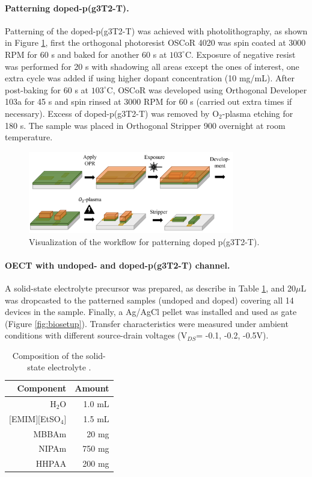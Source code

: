 \paragraph{Patterning doped-p(g3T2-T).}Patterning of the doped-p(g3T2-T) was achieved with photolithography, as shown in Figure \ref{fig:dopedpat}, first the orthogonal photoresist OSCoR 4020 was spin coated at 3000 RPM for 60 s and baked for another 60 s at $103^{\circ}$C. Exposure of negative resist was performed for 20 s with shadowing all areas except the ones of interest, one extra cycle was added if using higher dopant concentration (10 mg/mL). After post-baking for 60 s at $103^{\circ}$C, OSCoR was developed using Orthogonal Developer 103a for 45 s and spin rinsed at 3000 RPM for 60 s (carried out extra times if necessary). Excess of doped-p(g3T2-T) was removed by O$_{2}$-plasma etching for 180 s. The sample was placed in Orthogonal Stripper 900 overnight at room temperature.

\begin{figure}[ht]
	\centering
	\includegraphics[width=9cm]{Images/pdf/doped-patterning.pdf}
	\caption{Visualization of the workflow for patterning doped p(g3T2-T).}
	\label{fig:dopedpat}
\end{figure}

\paragraph{OECT with undoped- and doped-p(g3T2-T) channel.} A solid-state electrolyte precursor was prepared, as describe in Table \ref{tab:sse}, and 20$\mu$L was dropcasted to the patterned samples (undoped and doped) covering all 14 devices in the sample. Finally, a Ag/AgCl pellet was installed and used as gate (Figure \ref{fig:biosetup}). Transfer characteristics were measured under ambient conditions with different source-drain voltages (V$_{DS}$= -0.1, -0.2, -0.5V).

\begin{table}[h]
	\centering
	\caption{Composition of the solid-state electrolyte \cite{weissbachPhotopatternableSolidElectrolyte2022}.}
	\begin{tabular}{r r} \hline
		Component   & Amount \\ \hline
		H$_{2}$O	& 1.0 mL \\ 
		$[$EMIM$][$EtSO$_{4}]$   & 1.5 mL \\ 
		MBBAm   & 20 mg \\ 
		NIPAm   & 750 mg \\ 
		HHPAA   & 200 mg \\ \hline
	\end{tabular}
	\label{tab:sse}
\end{table}

